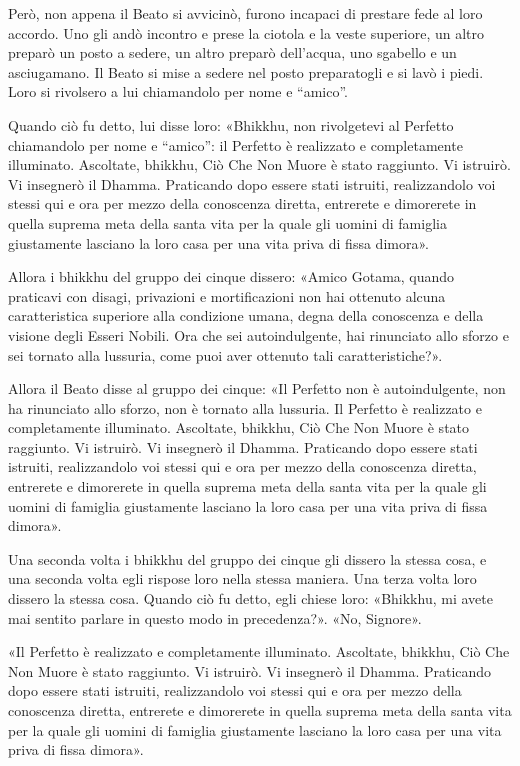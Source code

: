 Però, non appena il Beato si avvicinò, furono incapaci di prestare fede
al loro accordo. Uno gli andò incontro e prese la ciotola e la veste
superiore, un altro preparò un posto a sedere, un altro preparò
dell’acqua, uno sgabello e un asciugamano. Il Beato si mise a sedere nel
posto preparatogli e si lavò i piedi. Loro si rivolsero a lui
chiamandolo per nome e “amico”.


Quando ciò fu detto, lui disse loro: «Bhikkhu, non rivolgetevi al
Perfetto chiamandolo per nome e “amico”: il Perfetto è realizzato e
completamente illuminato. Ascoltate, bhikkhu, Ciò Che Non Muore è stato
raggiunto. Vi istruirò. Vi insegnerò il Dhamma. Praticando dopo essere
stati istruiti, realizzandolo voi stessi qui e ora per mezzo della
conoscenza diretta, entrerete e dimorerete in quella suprema meta della
santa vita per la quale gli uomini di famiglia giustamente lasciano la
loro casa per una vita priva di fissa dimora».


Allora i bhikkhu del gruppo dei cinque dissero: «Amico Gotama, quando
praticavi con disagi, privazioni e mortificazioni non hai ottenuto
alcuna caratteristica superiore alla condizione umana, degna della
conoscenza e della visione degli Esseri Nobili. Ora che sei
autoindulgente, hai rinunciato allo sforzo e sei tornato alla lussuria,
come puoi aver ottenuto tali caratteristiche?».


Allora il Beato disse al gruppo dei cinque: «Il Perfetto non è
autoindulgente, non ha rinunciato allo sforzo, non è tornato alla
lussuria. Il Perfetto è realizzato e completamente illuminato.
Ascoltate, bhikkhu, Ciò Che Non Muore è stato raggiunto. Vi istruirò. Vi
insegnerò il Dhamma. Praticando dopo essere stati istruiti,
realizzandolo voi stessi qui e ora per mezzo della conoscenza diretta,
entrerete e dimorerete in quella suprema meta della santa vita per la
quale gli uomini di famiglia giustamente lasciano la loro casa per una
vita priva di fissa dimora».


Una seconda volta i bhikkhu del gruppo dei cinque gli dissero la stessa
cosa, e una seconda volta egli rispose loro nella stessa maniera. Una
terza volta loro dissero la stessa cosa. Quando ciò fu detto, egli
chiese loro: «Bhikkhu, mi avete mai sentito parlare in questo modo in
precedenza?». «No, Signore».


«Il Perfetto è realizzato e completamente illuminato. Ascoltate,
bhikkhu, Ciò Che Non Muore è stato raggiunto. Vi istruirò. Vi insegnerò
il Dhamma. Praticando dopo essere stati istruiti, realizzandolo voi
stessi qui e ora per mezzo della conoscenza diretta, entrerete e
dimorerete in quella suprema meta della santa vita per la quale gli
uomini di famiglia giustamente lasciano la loro casa per una vita priva
di fissa dimora».


